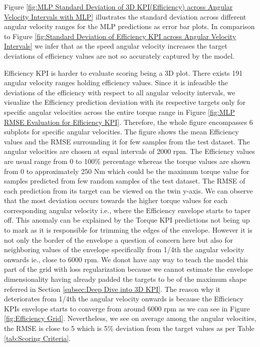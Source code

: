 \documentclass{report} %
\begin{document}
Figure \ref{fig:MLP Standard Deviation of 3D KPI(Efficiency) across Angular Velocity Intervals with MLP} illustrates the standard deviation across different 
angular velocity ranges for the \ac{MLP} predictions as error bar plots.
In comparison to Figure \ref{fig:Standard Deviation of Efficiency KPI across Angular Velocity Intervals} we infer that as the speed angular 
velocity increases the target deviations of efficiency values are not so accurately captured by the model.

Efficiency \ac{KPI} is harder to evaluate scoring being a 3\ac{D} plot. There exists 191 angular velocity ranges holding efficiency values.
Since it is infeasible the deviations of the efficiency with respect to all angular velocity intervals, we visualize the Efficiency prediction deviation 
with its respective targets only for specific angular velocities across the entire torque range in Figure \ref{fig:MLP RMSE Evaluation for Efficiency KPI}. Therefore, the 
whole figure encompasses 6 subplots for specific angular velocities.
The figure shows the mean Efficiency values and the \ac{RMSE} surrounding it for few samples from the test dataset.
The angular velocities are chosen at equal intervals of 2000 rpm. The Efficiency values are usual range from 0 to 100\% percentage whereas the torque values are shown 
from 0 to approximately 250 Nm which could be the maximum torque value for samples predicted from few random samples of the test dataset.
The \ac{RMSE} of each prediction from its target can be viewed on the twin y-axis.
We can observe that the most deviation occurs towards the higher torque values for each corresponding angular velocity i.e., where the Efficiency envelope starts to taper off.
This anomaly can be explained by the Torque \ac{KPI} predictions not being up to mark as it is responsible for trimming the edges of the envelope.
However it is not only the border of the envelope a question of concern here but also for neighboring values of the envelope specifically from 1/4th the 
angular velocity onwards ie., close to 6000 rpm. 
We donot have any way to teach the model this part of the grid with loss regularization because we cannot estimate the envelope dimensionality having already padded 
the targets to be of the maximum shape referred in Section \ref{subsec:Deep Dive into 3D KPI}. The reason why it deteriorates from 1/4th the angular velocity onwards is 
because the Efficiency \ac{KPI}s envelope starts to converge from around 6000 rpm as we can see in Figure \ref{fig:Efficiency Grid}.
Nevertheless, we see on average among the angular velocities, the \ac{RMSE} is close to 5 which is 5\% deviation from the target values as per Table \ref{tab:Scoring Criteria}.
\end{document}

